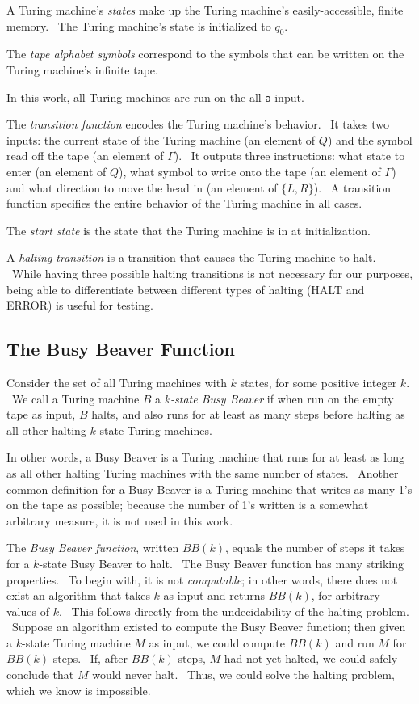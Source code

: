 \documentclass[11pt]{article}
\begin{document}
A Turing machine's \emph{states} make up the Turing machine's easily-accessible, finite memory. \ The Turing machine's state is initialized to $q_0$.

The \emph{tape alphabet symbols} correspond to the symbols that can be written on the Turing machine's infinite tape.

In this work, all Turing machines are run on the all-\texttt{a} input.

The \emph{transition function} encodes the Turing machine's behavior. \ It takes two inputs: the current state of the Turing machine (an element of $Q$) and the symbol read off the tape (an element of $\Gamma$). \ It outputs three instructions: what state to enter (an element of $Q$), what symbol to write onto the tape (an element of $\Gamma$) and what direction to move the head in (an element of $\{L, R\}$). \ A transition function specifies the entire behavior of the Turing machine in all cases.

The \emph{start state} is the state that the Turing machine is in at initialization.

A \emph{halting transition} is a transition that causes the Turing machine to halt. \ While having three possible halting transitions is not necessary for our purposes, being able to differentiate between different types of halting (HALT and ERROR) is useful for testing.

\subsection{The Busy Beaver Function}

Consider the set of all Turing machines with $k$ states, for some positive integer $k$. \ We call a Turing machine $B$ a $k$\emph{-state Busy Beaver} if when run on the empty tape as input, $B$ halts, and also runs for at least as many steps before halting as all other halting $k$-state Turing machines.~\cite{busybeaver}

In other words, a Busy Beaver is a Turing machine that runs for at least as long as all other halting Turing machines with the same number of states. \ Another common definition for a Busy Beaver is a Turing machine that writes as many 1's on the tape as possible; because the number of 1's written is a somewhat arbitrary measure, it is not used in this work.

The \emph{Busy Beaver function}, written $BB(k)$, equals the number of steps it takes for a $k$-state Busy Beaver to halt. \ The Busy Beaver function has many striking properties. \ To begin with, it is not \emph{computable}; in other words, there does not exist an algorithm that takes $k$ as input and returns $BB(k)$, for arbitrary values of $k$. \ This follows directly from the undecidability of the halting problem. \ Suppose an algorithm existed to compute the Busy Beaver function; then given a $k$-state Turing machine $M$ as input, we could compute $BB(k)$ and run $M$ for $BB(k)$ steps. \ If, after $BB(k)$ steps, $M$ had not yet halted, we could safely conclude that $M$ would never halt. \ Thus, we could solve the halting problem, which we know is impossible.
\end{document}
